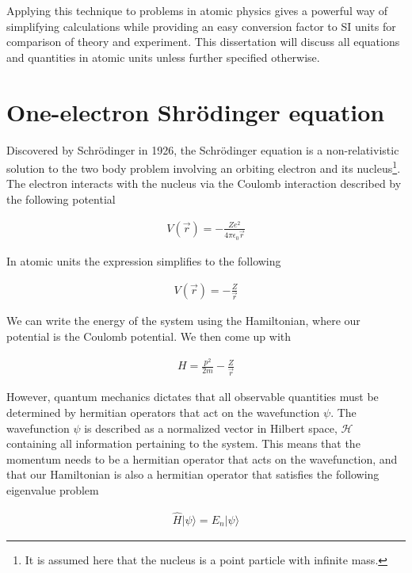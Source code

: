         Applying this technique to problems in atomic physics gives a powerful way of simplifying calculations while providing an easy conversion factor to SI units for comparison of theory and experiment. This dissertation will discuss all equations and quantities in atomic units unless further specified otherwise.


    \section{One-electron Shrödinger equation} \label{sec:Schrodinger_Equation}
        Discovered by Schrödinger in 1926, the Schrödinger equation is a non-relativistic solution to the two body problem involving an orbiting electron and its nucleus\footnote{It is assumed here that the nucleus is a point particle with infinite mass.}. The electron interacts with the nucleus via the Coulomb interaction described by the following potential

        \begin{align}
            V(\vec{r}) = -\frac{Z e^2}{4\pi \epsilon_0 \vec{r}}
        \end{align}

        In atomic units the expression simplifies to the following

        \begin{align}
            V(\vec{r}) = -\frac{Z}{\vec{r}}
        \end{align}

        \noindent We can write the energy of the system using the Hamiltonian, where our potential is the Coulomb potential. We then come up with 

        \begin{align}
            H = \frac{p^2}{2m} - \frac{Z}{\vec{r}}
        \end{align}

        \noindent However, quantum mechanics dictates that all observable quantities must be determined by hermitian operators that act on the wavefunction $\psi$. The wavefunction $\psi$ is described as a normalized vector in Hilbert space, $\mathcal{H}$ containing all information pertaining to the system. This means that the momentum needs to be a hermitian operator that acts on the wavefunction, and that our Hamiltonian is also a hermitian operator that satisfies the following eigenvalue problem 

        \begin{align}
            \hat{H} \vert\psi \rangle = E_n \vert \psi \rangle
        \end{align}

